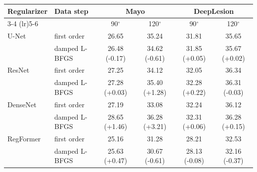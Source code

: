 \begin{tabular}{llcccc}
\toprule
Regularizer & Data step & \multicolumn{2}{c}{Mayo} & \multicolumn{2}{c}{DeepLesion} \\
\cmidrule(lr){3-4} \cmidrule(lr){5-6}
 & & 90$^\circ$ & 120$^\circ$ & 90$^\circ$ & 120$^\circ$ \\
\midrule
U-Net & first order & 26.65 & 35.24 & 31.81 & 35.65 \\
 & damped L-BFGS & 26.48 \textcolor{red!70!black}{\scriptsize(-0.17)} & 34.62 \textcolor{red!70!black}{\scriptsize(-0.61)} & 31.85 \textcolor{green!50!black}{\scriptsize(+0.05)} & 35.67 \textcolor{green!50!black}{\scriptsize(+0.02)} \\
\midrule
ResNet & first order & 27.25 & 34.12 & 32.05 & 36.34 \\
 & damped L-BFGS & 27.28 \textcolor{green!50!black}{\scriptsize(+0.03)} & 35.40 \textcolor{green!50!black}{\scriptsize(+1.28)} & 32.28 \textcolor{green!50!black}{\scriptsize(+0.22)} & 36.31 \textcolor{red!70!black}{\scriptsize(-0.03)} \\
\midrule
DenseNet & first order & 27.19 & 33.08 & 32.24 & 36.12 \\
 & damped L-BFGS & 28.65 \textcolor{green!50!black}{\scriptsize(+1.46)} & 36.28 \textcolor{green!50!black}{\scriptsize(+3.21)} & 32.31 \textcolor{green!50!black}{\scriptsize(+0.06)} & 36.28 \textcolor{green!50!black}{\scriptsize(+0.15)} \\
\midrule
RegFormer & first order & 25.16 & 31.28 & 28.21 & 32.53 \\
 & damped L-BFGS & 25.63 \textcolor{green!50!black}{\scriptsize(+0.47)} & 30.67 \textcolor{red!70!black}{\scriptsize(-0.61)} & 28.13 \textcolor{red!70!black}{\scriptsize(-0.08)} & 32.16 \textcolor{red!70!black}{\scriptsize(-0.37)} \\
\bottomrule
\end{tabular}
